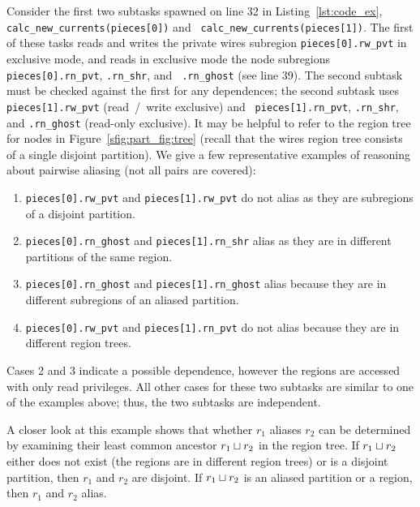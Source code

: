 Consider the first two subtasks spawned on line 32 
in Listing~\ref{lst:code_ex}, {\tt
calc\_new\_currents(pieces[0])} and {\tt
calc\_new\_currents(pieces[1])}.  The first of these tasks reads and
writes the private wires subregion {\tt pieces[0].rw\_pvt} in
exclusive mode, and reads in exclusive mode the node subregions {\tt
pieces[0].rn\_pvt}, {\tt .rn\_shr}, and {\tt
.rn\_ghost} (see line 39).  The second subtask must be
checked against the first for any dependences; the second subtask uses
{\tt pieces[1].rw\_pvt} (read~/~write exclusive) and {\tt
pieces[1].rn\_pvt}, {\tt .rn\_shr}, and {\tt .rn\_ghost} (read-only exclusive).
It may be helpful to refer to the region tree for nodes in Figure~\ref{sfig:part_fig:tree} (recall that the wires region tree consists of a single disjoint partition).  We give a few representative examples
of reasoning about pairwise aliasing (not all pairs are covered):
\begin{enumerate}
\item {\tt pieces[0].rw\_pvt} and {\tt pieces[1].rw\_pvt} do not alias as they are subregions of a disjoint partition.
\item {\tt pieces[0].rn\_ghost} and {\tt pieces[1].rn\_shr} alias as they are in different
  partitions of the same region.
\item {\tt pieces[0].rn\_ghost} and {\tt pieces[1].rn\_ghost} alias because they are in different subregions of
an aliased partition.
\item {\tt pieces[0].rw\_pvt} and {\tt pieces[1].rn\_pvt}
do not alias because they are in different region trees.
\end{enumerate}
Cases 2 and 3 indicate a possible dependence, however the regions are
accessed with only read privileges. All other cases for these two
subtasks are similar to one of the examples above; thus, the two
subtasks are independent.

A closer look at this example shows that whether 
$r_1$ aliases $r_2$ can be determined by examining
their least common ancestor $r_1 \sqcup r_2$ in the region tree.  
If $r_1 \sqcup r_2$ either does not exist (the regions
are in different region trees) or is a disjoint partition, then $r_1$
and $r_2$ are disjoint.  If $r_1 \sqcup r_2$ is an
aliased partition or a region, 
then $r_1$ and $r_2$ alias.

